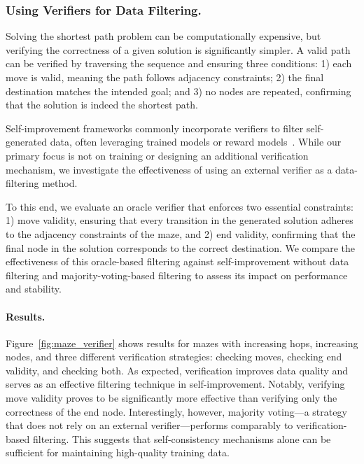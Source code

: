\subsubsection{Using Verifiers for Data Filtering. }
Solving the shortest path problem can be computationally expensive, but verifying the correctness of a given solution is significantly simpler. A valid path can be verified by traversing the sequence and ensuring three conditions: 1) each move is valid, meaning the path follows adjacency constraints; 2) the final destination matches the intended goal; and 3) no nodes are repeated, confirming that the solution is indeed the shortest path.

Self-improvement frameworks commonly incorporate verifiers to filter self-generated data, often leveraging trained models or reward models~\citep{zelikman2022star,singh2023beyond,hosseini2024v,lightman2023let}. While our primary focus is not on training or designing an additional verification mechanism, we investigate the effectiveness of using an external verifier as a data-filtering method.

To this end, we evaluate an oracle verifier that enforces two essential constraints: 1) move validity, ensuring that every transition in the generated solution adheres to the adjacency constraints of the maze, and 2) end validity, confirming that the final node in the solution corresponds to the correct destination. We compare the effectiveness of this oracle-based filtering against self-improvement without data filtering and majority-voting-based filtering to assess its impact on performance and stability.

\paragraph{Results. }
Figure~\ref{fig:maze_verifier} shows results for mazes with increasing hops, increasing nodes, and three different verification strategies: checking moves, checking end validity, and checking both. As expected, verification improves data quality and serves as an effective filtering technique in self-improvement. Notably, verifying move validity proves to be significantly more effective than verifying only the correctness of the end node. Interestingly, however, majority voting—a strategy that does not rely on an external verifier—performs comparably to verification-based filtering. This suggests that self-consistency mechanisms alone can be sufficient for maintaining high-quality training data. 

